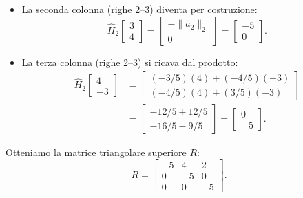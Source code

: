\begin{example}
\begin{enumerate}
\begin{itemize}
\begin{equation}
            R_{1, :} = \begin{bmatrix} -5 & 4 & 2 \end{bmatrix}, \qquad R_{:, 1} = \begin{bmatrix} -5 \\ 0 \\ 0 \end{bmatrix}.
        \end{equation}
        \item La seconda colonna (righe 2--3) diventa per costruzione:
        \begin{equation}
            \hat{H}_2 \begin{bmatrix} 3 \\ 4 \end{bmatrix} = \begin{bmatrix} -\|\tilde{a}_2\|_2 \\ 0 \end{bmatrix} = \begin{bmatrix} -5 \\ 0 \end{bmatrix}.
        \end{equation}
        \item La terza colonna (righe 2--3) si ricava dal prodotto:
        \begin{align}
            \hat{H}_2 \begin{bmatrix} 4 \\ -3 \end{bmatrix} &= \begin{bmatrix} (-3/5)(4) + (-4/5)(-3) \\ (-4/5)(4) + (3/5)(-3) \end{bmatrix} \nonumber\\
            &= \begin{bmatrix} -12/5 + 12/5 \\ -16/5 - 9/5 \end{bmatrix} = \begin{bmatrix} 0 \\ -5 \end{bmatrix}.
        \end{align}
    \end{itemize}
    Otteniamo la matrice triangolare superiore $R$:
    \begin{equation}
        R = \begin{bmatrix} 
        -5 & 4 & 2 \\ 
        0 & -5 & 0 \\ 
        0 & 0 & -5 
        \end{bmatrix}.

\end{equation}
\end{enumerate}
\end{example}
